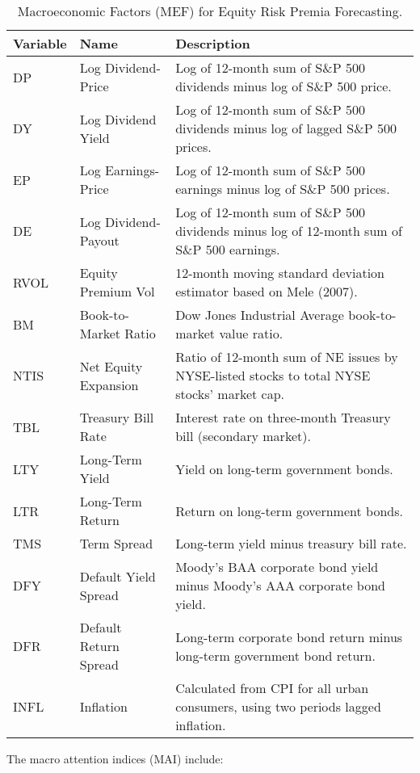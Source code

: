 \documentclass{article}
\begin{document}
\begin{table}[H]
\centering
\begin{tabular}{|l|l|p{7.5cm}|}
\hline
\textbf{Variable} & \textbf{Name} & \textbf{Description} \\
\hline
DP & Log Dividend-Price & Log of 12-month sum of S\&P 500 dividends minus log of S\&P 500 price. \\
DY & Log Dividend Yield & Log of 12-month sum of S\&P 500 dividends minus log of lagged S\&P 500 prices. \\
EP & Log Earnings-Price & Log of 12-month sum of S\&P 500 earnings minus log of S\&P 500 prices. \\
DE & Log Dividend-Payout & Log of 12-month sum of S\&P 500 dividends minus log of 12-month sum of S\&P 500 earnings. \\
RVOL & Equity Premium Vol & 12-month moving standard deviation estimator based on Mele (2007). \\
BM & Book-to-Market Ratio & Dow Jones Industrial Average book-to-market value ratio. \\
NTIS & Net Equity Expansion & Ratio of 12-month sum of NE issues by NYSE-listed stocks to total NYSE stocks' market cap. \\
TBL & Treasury Bill Rate & Interest rate on three-month Treasury bill (secondary market). \\
LTY & Long-Term Yield & Yield on long-term government bonds. \\
LTR & Long-Term Return & Return on long-term government bonds. \\
TMS & Term Spread & Long-term yield minus treasury bill rate. \\
DFY & Default Yield Spread & Moody's BAA corporate bond yield minus Moody's AAA corporate bond yield. \\
DFR & Default Return Spread & Long-term corporate bond return minus long-term government bond return. \\
INFL & Inflation & Calculated from CPI for all urban consumers, using two periods lagged inflation. \\
\hline
\end{tabular}
\caption{Macroeconomic Factors (MEF) for Equity Risk Premia Forecasting.}
\end{table}


\noindent The macro attention indices (MAI) include:
\end{document}
